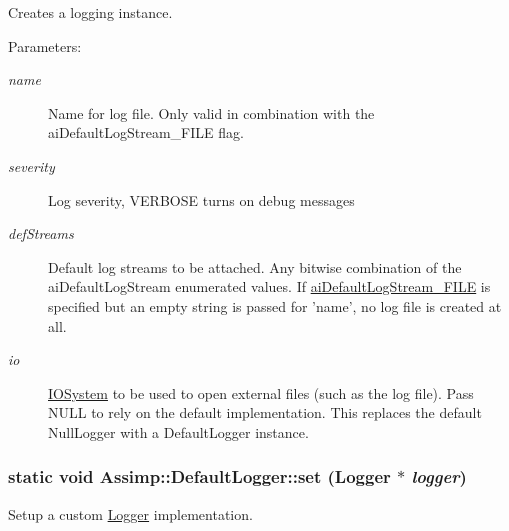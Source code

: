 Creates a logging instance. 

\begin{Desc}
\item[Parameters:]
\begin{description}
\item[{\em name}]Name for log file. Only valid in combination with the aiDefaultLogStream\_\-FILE flag. \item[{\em severity}]Log severity, VERBOSE turns on debug messages \item[{\em defStreams}]Default log streams to be attached. Any bitwise combination of the aiDefaultLogStream enumerated values. If \hyperlink{types_8h_e4271f61a7c06cd4770fc3e11f58f9c653f81f9d36437ced72e67b297dc17815}{aiDefaultLogStream\_\-FILE} is specified but an empty string is passed for 'name', no log file is created at all. \item[{\em io}]\hyperlink{class_assimp_1_1_i_o_system}{IOSystem} to be used to open external files (such as the log file). Pass NULL to rely on the default implementation. This replaces the default NullLogger with a DefaultLogger instance. \end{description}
\end{Desc}
\hypertarget{class_assimp_1_1_default_logger_9daba548026045b99813c760c2842ed2}{
\subsubsection[set]{\setlength{\rightskip}{0pt plus 5cm}static void Assimp::DefaultLogger::set ({\bf Logger} $\ast$ {\em logger})}}
\label{class_assimp_1_1_default_logger_9daba548026045b99813c760c2842ed2}


Setup a custom \hyperlink{class_assimp_1_1_logger_784e6d1a741072b17bab32a6a41055e8}{Logger} implementation. 

